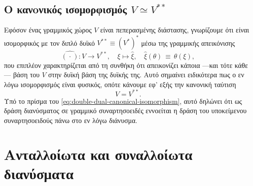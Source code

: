 \documentclass[11pt,a4paper,twoside,openright]{book}
\begin{document}
\subsection{O κανoνικός ισομορφισμός $V \simeq V^{**}$}

Εφόσον ένας γραμμικός χώρος $V$ είναι πεπερασμένης διάστασης,
γνωρίζουμε ότι είναι ισομορφικός με τον διπλό δυϊκό
$V^{**} \equiv \left(V^*\right)^*$
μέσω της γραμμικής απεικόνισης
\begin{equation}\label{eq:double-dual-canonical-isomorphism}
\hat{(\hspace{1pt}\cdot\hspace{1pt})}: V \to V^{**},
\quad
\xi \mapsto \hat{\xi},
\quad
\hat{\xi}(\theta)
\,\equiv\,
\theta(\xi),
\end{equation}
που επιπλέον χαρακτηρίζεται από τη συνθήκη
ότι απεικονίζει κάποια ---και τότε κάθε--- βάση του $V$
στην δυϊκή βάση της δυϊκής της.
Αυτό σημαίνει ειδικότερα πως ο εν λόγω ισομορφισμός
είναι φυσικός,
οπότε κάνουμε εφ' εξής την κανονική ταύτιση
\begin{equation}\label{eq:double-dual-canonical-identification}
V = V^{**}.
\end{equation}
Υπό το πρίσμα του \eqref{eq:double-dual-canonical-isomorphism},
αυτό δηλώνει ότι ως δράση διανύσματος
σε γραμμικό συναρτησοειδές εννοείται
η δράση του υποκείμενου συναρτησοειδούς
πάνω στο εν λόγω διάνυσμα.

\section{Ανταλλοίωτα και συναλλοίωτα διανύσματα}
	\label{sec:contravariant-covariant-vectors}
\end{document}
